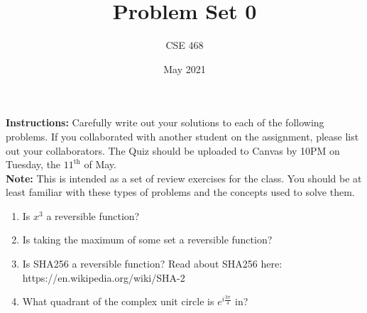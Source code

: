 \documentclass[12pt]{article}
\title{Problem Set 0}
\author{CSE 468}
\date{May 2021}
\begin{document}
\maketitle

\noindent \textbf{Instructions:} Carefully write out your solutions to each of the following problems. If you collaborated with another student on the assignment, please list out your collaborators. The Quiz should be uploaded to Canvas by 10PM on Tuesday, the $11^{\text{th}}$ of May. \\
\textbf{Note:} This is intended as a set of review exercises for the class. You should be at least familiar with these types of problems and the concepts used to solve them.

\begin{enumerate}[font=\bfseries]
    \item Is $x^3$ a reversible function?
    \item Is taking the maximum of some set a reversible function?
    \item Is SHA256 a reversible function? Read about SHA256 here: https://en.wikipedia.org/wiki/SHA-2
    \item What quadrant of the complex unit circle is $e^{i\frac{3\pi}{4}}$ in?
    
\end{enumerate}
\end{document}
